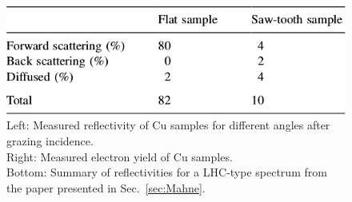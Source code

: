 \begin{figure}[tbh]
    \begin{minipage}[c]{0.48\textwidth}
        \includegraphics[width=\textwidth]{../ss/mahne_table.png}
    \end{minipage}
    \caption{
        Left: Measured reflectivity of Cu samples for different angles after grazing incidence.
        \\
        Right: Measured electron yield of Cu samples.
        \\
        Bottom: Summary of reflectivities for a LHC-type spectrum from the paper presented in Sec.~\ref{sec:Mahne}.
    }
    \label{fig:mahne}

\end{figure}



